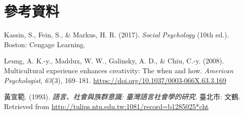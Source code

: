 \documentclass[oneside]{book}
\let\oldhref=\href
\renewcommand{\href}[2]{#2\footnote{\url{#1}}}
\theoremstyle{definition}
\theoremstyle{definition}
\theoremstyle{definition}
\theoremstyle{remark}
\begin{document}
\renewcommand{\href}{\oldhref}

\chapter*{參考資料}\label{references}

\hypertarget{refs}{}
\hypertarget{ref-kassin2017}{}
Kassin, S., Fein, S., \& Markus, H. R. (2017). \emph{Social Psychology}
(10th ed.). Boston: Cengage Learning.

\hypertarget{ref-leung2008}{}
Leung, A. K.-y., Maddux, W. W., Galinsky, A. D., \& Chiu, C.-y. (2008).
Multicultural experience enhances creativity: The when and how.
\emph{American Psychologist}, \emph{63}(3), 169--181.
\url{https://doi.org/10.1037/0003-066X.63.3.169}

\hypertarget{ref-huangxuanfan1993}{}
黃宣範. (1993). \emph{語言、社會與族群意識: 臺灣語言社會學的研究}.
臺北市: 文鶴. Retrieved from
\url{http://tulips.ntu.edu.tw:1081/record=b1285025*cht}
\end{document}
